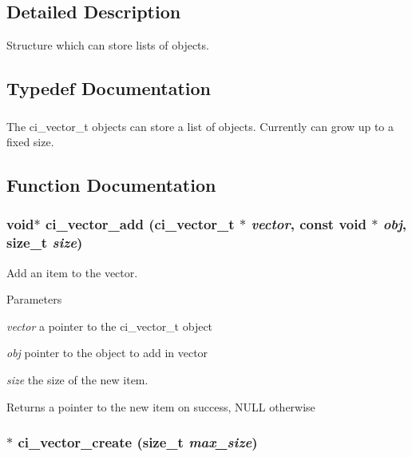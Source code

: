 \subsection{Detailed Description}
Structure which can store lists of objects. 

\subsection{Typedef Documentation}
\hypertarget{group__VECTORS_ga911840034b768c5380eba22ad04d3c66}{
\subsubsection[{ci\_\-vector\_\-t}]{}}
\label{group__VECTORS_ga911840034b768c5380eba22ad04d3c66}


The ci\_\-vector\_\-t objects can store a list of objects. Currently can grow up to a fixed size. 

\subsection{Function Documentation}
\hypertarget{group__VECTORS_gaa4926d83176fa238117272065f30d7bc}{
\subsubsection[{ci\_\-vector\_\-add}]{\setlength{\rightskip}{0pt plus 5cm}void$\ast$ ci\_\-vector\_\-add ({\bf ci\_\-vector\_\-t} $\ast$ {\em vector}, \/  const void $\ast$ {\em obj}, \/  size\_\-t {\em size})}}
\label{group__VECTORS_gaa4926d83176fa238117272065f30d7bc}


Add an item to the vector. 
\begin{DoxyParams}{Parameters}
\item[{\em vector}]a pointer to the ci\_\-vector\_\-t object \item[{\em obj}]pointer to the object to add in vector \item[{\em size}]the size of the new item. \end{DoxyParams}
\begin{DoxyReturn}{Returns}
a pointer to the new item on success, NULL otherwise 
\end{DoxyReturn}
\hypertarget{group__VECTORS_ga74dd5a2e00ded0702a2457437b12e37c}{
\subsubsection[{ci\_\-vector\_\-create}]{$\ast$ ci\_\-vector\_\-create (size\_\-t {\em max\_\-size})}}
\label{group__VECTORS_ga74dd5a2e00ded0702a2457437b12e37c}


